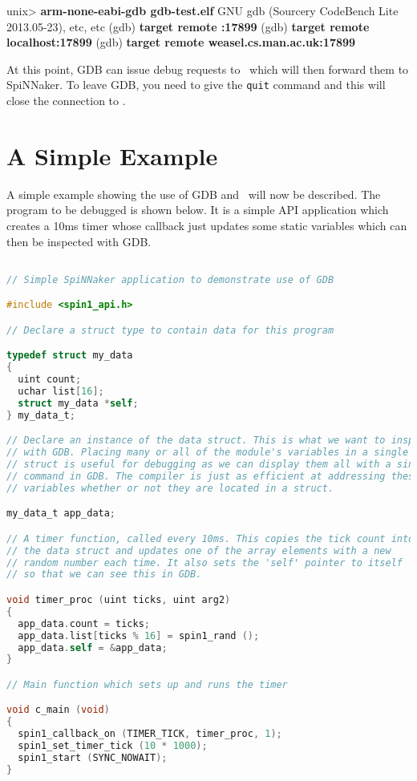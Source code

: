 \begin{shell}
unix> \textbf{arm-none-eabi-gdb gdb-test.elf}
GNU gdb (Sourcery CodeBench Lite 2013.05-23), etc, etc
(gdb) \textbf{target remote :17899}
(gdb) \textbf{target remote localhost:17899}
(gdb) \textbf{target remote weasel.cs.man.ac.uk:17899}
\end{shell}

At this point, GDB can issue debug requests to \gdbspin\ which will
then forward them to SpiNNaker. To leave GDB, you need to give
the \texttt{quit} command and this will close the connection to
\gdbspin.

\section{A Simple Example}

A simple example showing the use of GDB and \gdbspin\ will now be
described. The program to be debugged is shown below. It is a simple
API application which creates a 10ms timer whose callback just updates
some static variables which can then be inspected with GDB.

\begin{lstlisting}[language=C]

// Simple SpiNNaker application to demonstrate use of GDB

#include <spin1_api.h>

// Declare a struct type to contain data for this program

typedef struct my_data
{
  uint count;
  uchar list[16];
  struct my_data *self;
} my_data_t;

// Declare an instance of the data struct. This is what we want to inspect
// with GDB. Placing many or all of the module's variables in a single
// struct is useful for debugging as we can display them all with a single
// command in GDB. The compiler is just as efficient at addressing these
// variables whether or not they are located in a struct.

my_data_t app_data;

// A timer function, called every 10ms. This copies the tick count into
// the data struct and updates one of the array elements with a new
// random number each time. It also sets the 'self' pointer to itself
// so that we can see this in GDB.

void timer_proc (uint ticks, uint arg2)
{
  app_data.count = ticks;
  app_data.list[ticks % 16] = spin1_rand ();
  app_data.self = &app_data;
}

// Main function which sets up and runs the timer

void c_main (void)
{
  spin1_callback_on (TIMER_TICK, timer_proc, 1);
  spin1_set_timer_tick (10 * 1000);
  spin1_start (SYNC_NOWAIT);
}
\end{lstlisting}

